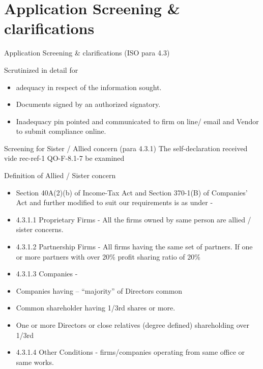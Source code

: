 \documentclass[
  10pt,
  ignorenonframetext,
  aspectratio=43,
]{beamer}
\providecommand{\tightlist}{%
  \setlength{\itemsep}{0pt}\setlength{\parskip}{0pt}}
\begin{document}
\hypertarget{application-screening-clarifications}{%
\section{Application Screening \&
clarifications}\label{application-screening-clarifications}}

\begin{frame}{Application Screening \& clarifications (ISO para 4.3)}
\protect\hypertarget{application-screening-clarifications-iso-para-4.3}{}
\begin{block}{Scrutinized in detail for}
\protect\hypertarget{scrutinized-in-detail-for}{}
\begin{itemize}
\tightlist
\item
  adequacy in respect of the information sought.
\item
  Documents signed by an authorized signatory.
\item
  Inadequacy pin pointed and communicated to firm on line/ email and
  Vendor to submit compliance online.
\end{itemize}
\end{block}
\end{frame}

\begin{frame}{Screening for Sister / Allied concern (para 4.3.1)}
\protect\hypertarget{screening-for-sister-allied-concern-para-4.3.1}{}
The self-declaration received vide rec-ref-1 QO-F-8.1-7 be examined

\begin{block}{Definition of Allied / Sister concern}
\protect\hypertarget{definition-of-allied-sister-concern}{}
\begin{itemize}
\tightlist
\item
  Section 40A(2)(b) of Income-Tax Act and Section 370-1(B) of Companies'
  Act and further modified to suit our requirements is as under -
\item
  4.3.1.1 Proprietary Firms - All the firms owned by same person are
  allied / sister concerns.
\item
  4.3.1.2 Partnership Firms - All firms having the same set of partners.
  If one or more partners with over 20\% profit sharing ratio of 20\%
\item
  4.3.1.3 Companies -
\item
  Companies having -- ``majority'' of Directors common
\item
  Common shareholder having 1/3rd shares or more.
\item
  One or more Directors or close relatives (degree defined) shareholding
  over 1/3rd
\item
  4.3.1.4 Other Conditions - firms/companies operating from same office
  or same works.
\end{itemize}
\end{block}
\end{frame}
\end{document}
